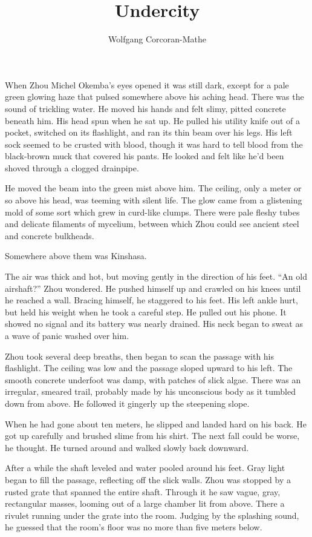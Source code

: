 \documentclass[10pt,b5paper]{article}
\begin{document}
\title{Undercity}
\author{Wolfgang Corcoran-Mathe}
\date{}
\maketitle

When Zhou Michel Okemba's eyes opened it was still dark, except for
a pale green glowing haze that pulsed somewhere above his aching
head. There was the sound of trickling water. He moved his hands
and felt slimy, pitted concrete beneath him. His head spun when he
sat up. He pulled his utility knife out of a pocket, switched on
its flashlight, and ran its thin beam over his legs. His left sock
seemed to be crusted with blood, though it was hard to tell blood
from the black-brown muck that covered his pants. He looked and
felt like he'd been shoved through a clogged drainpipe.

He moved the beam into the green mist above him. The ceiling, only a
meter or so above his head, was teeming with silent life. The glow
came from a glistening mold of some sort which grew in curd-like
clumps. There were pale fleshy tubes and delicate filaments of
mycelium, between which Zhou could see ancient steel and concrete
bulkheads.

Somewhere above them was Kinshasa.

The air was thick and hot, but moving gently in the direction of
his feet. ``An old airshaft?'' Zhou wondered. He pushed himself up
and crawled on his knees until he reached a wall. Bracing himself,
he staggered to his feet. His left ankle hurt, but held his weight
when he took a careful step. He pulled out his phone. It showed
no signal and its battery was nearly drained. His neck began to
sweat as a wave of panic washed over him.

Zhou took several deep breaths, then began to scan the passage with
his flashlight. The ceiling was low and the passage sloped upward
to his left. The smooth concrete underfoot was damp, with patches
of slick algae. There was an irregular, smeared trail, probably
made by his unconscious body as it tumbled down from above. He
followed it gingerly up the steepening slope.

When he had gone about ten meters, he slipped and landed hard on
his back. He got up carefully and brushed slime from his shirt. The
next fall could be worse, he thought. He turned around and walked
slowly back downward.

After a while the shaft leveled and water pooled around his
feet. Gray light began to fill the passage, reflecting off the slick
walls. Zhou was stopped by a rusted grate that spanned the entire
shaft. Through it he saw vague, gray, rectangular masses, looming
out of a large chamber lit from above. There a rivulet running
under the grate into the room. Judging by the splashing sound,
he guessed that the room's floor was no more than five meters below.
\end{document}
